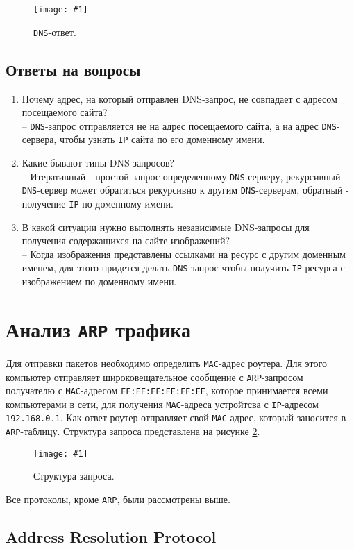 \documentclass[12pt, a4paper]{article}
\newcommand{\figc}[4]{
  \begin{figure}[H]
  \begin{center}
    \texttt{[image: \#1]}
    \caption{#2}
    \label{fig:#3}
  \end{center}
  \end{figure}
}
\begin{document}
\figc{dns_res}{\texttt{DNS}-ответ.}{d_rs}{2.5}

\subsection{Ответы на вопросы}

\begin{enumerate}
  \item Почему адрес, на который отправлен DNS-запрос, не совпадает с адресом
    посещаемого сайта?\\
    -- \texttt{DNS}-запрос отправляется не на адрес посещаемого сайта, а на
    адрес \texttt{DNS}-сервера, чтобы узнать \texttt{IP} сайта по его доменному
    имени.
  \item Какие бывают типы DNS-запросов?\\
    -- Итеративный - простой запрос определенному \texttt{DNS}-серверу, рекурсивный -
    \texttt{DNS}-сервер может обратиться рекурсивно к другим \texttt{DNS}-серверам,
    обратный - получение \texttt{IP} по доменному имени.
  \item В какой ситуации нужно выполнять независимые DNS-запросы для получения
    содержащихся на сайте изображений?\\
    -- Когда изображения представлены ссылками на ресурс с другим доменным
    именем, для этого придется делать \texttt{DNS}-запрос чтобы получить \texttt{IP}
    ресурса с изображением по доменному имени.
\end{enumerate}

\section{Анализ \texttt{ARP} трафика}

Для отправки пакетов необходимо определить \texttt{MAC}-адрес роутера. Для этого
компьютер отправляет широковещательное сообщение с \texttt{ARP}-запросом
получателю с \texttt{MAC}-адресом \texttt{FF:FF:FF:FF:FF:FF}, которое принимается
всеми компьютерами в сети, для получения \texttt{MAC}-адреса устройтсва с
\texttt{IP}-адресом \texttt{192.168.0.1}. Как ответ роутер отправляет свой
\texttt{MAC}-адрес, который заносится в \texttt{ARP}-таблицу. Структура запроса
представлена на рисунке \ref{fig:a_h}.

\figc{arp_headers}{Структура запроса.}{a_h}{0.7}

Все протоколы, кроме \texttt{ARP}, были рассмотрены выше.

\subsection{Address Resolution Protocol}
\end{document}
